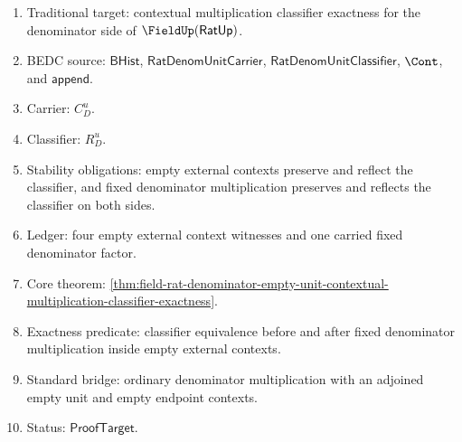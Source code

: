 \begin{enumerate}
  \item Traditional target: contextual multiplication classifier exactness for
  the denominator side of $\FieldUp(\mathsf{RatUp})$.
  \item BEDC source: $\mathsf{BHist}$,
  $\mathsf{RatDenomUnitCarrier}$, $\mathsf{RatDenomUnitClassifier}$,
  $\Cont$, and $\mathsf{append}$.
  \item Carrier: $C_D^u$.
  \item Classifier: $R_D^u$.
  \item Stability obligations: empty external contexts preserve and reflect the
  classifier, and fixed denominator multiplication preserves and reflects the
  classifier on both sides.
  \item Ledger: four empty external context witnesses and one carried fixed
  denominator factor.
  \item Core theorem:
  \autoref{thm:field-rat-denominator-empty-unit-contextual-multiplication-classifier-exactness}.
  \item Exactness predicate: classifier equivalence before and after fixed
  denominator multiplication inside empty external contexts.
  \item Standard bridge: ordinary denominator multiplication with an adjoined
  empty unit and empty endpoint contexts.
  \item Status: $\mathsf{ProofTarget}$.
\end{enumerate}
